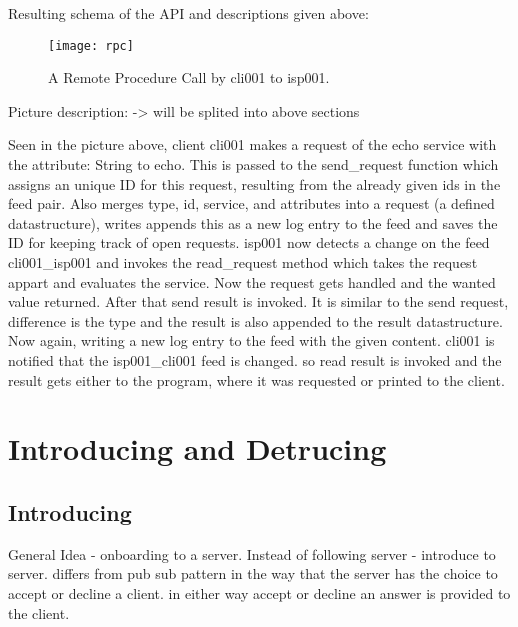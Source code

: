 Resulting schema of the API and descriptions given above:

\begin{figure}
    \centering
    \texttt{[image: rpc]}
    \caption{A Remote Procedure Call by cli001 to isp001.}
    \label{fig:contract_cli_isp}
\end{figure}


Picture description: -> will be splited into above sections

Seen in the picture above, client cli001 makes a request of the echo service with the attribute: String to echo. This is passed to the send\_request function which assigns an unique ID for this request, resulting from the already given ids in the feed pair. Also merges type, id, service, and attributes into a request (a defined datastructure), writes appends this as a new log entry to the feed and saves the ID for keeping track of open requests. isp001 now detects a change on the feed cli001\_isp001 and invokes the read\_request method which takes the request appart and evaluates the service. Now the request gets handled and the wanted value returned. After that send result is invoked. It is similar to the send request, difference is the type and the result is also appended to the result datastructure. Now again, writing a new log entry to the feed with the given content. cli001 is notified that the isp001\_cli001 feed is changed. so read result is invoked and the result gets either to the program, where it was requested or printed to the client.

\section{Introducing and Detrucing}
\subsection{Introducing}
General Idea - 
onboarding to a server. Instead of following server - introduce to server. differs from pub sub pattern in the way that the server has the choice to accept or decline a client. in either way accept or decline an answer is provided to the client.

